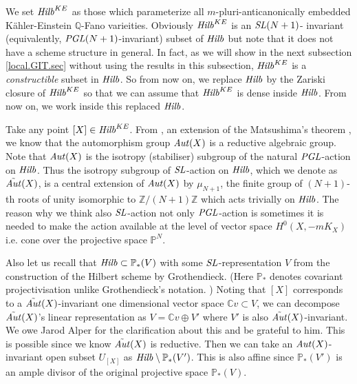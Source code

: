 \documentclass[12pt]{amsart}
\theoremstyle{remark}
\theoremstyle{definition}
\begin{document}
We set 
${\it Hilb}^{KE}$ as those which parameterize all $m$-pluri-anticanonically 
embedded K\"ahler-Einstein $\mathbb{Q}$-Fano varieities. 
Obviously ${\it Hilb}^{KE}$ is an ${\it SL}(N+1)$-
invariant (equivalently, ${\it PGL}(N+1)$-invariant) subset of ${\it Hilb}$ but note that it does not have a scheme structure in general. 
In fact, as we will show in the next subsection \ref{local.GIT.sec} 
without using the results in this subsection, 
${\it Hilb}^{KE}$ is a \textit{constructible} subset in ${\it Hilb}$. 
So from now on, we replace ${\it Hilb}$ by the Zariski closure 
of ${\it Hilb}^{KE}$ so that we can assume that ${\it Hilb}^{KE}$ 
is dense inside ${\it Hilb}$. From now on, we work inside this 
replaced ${\it Hilb}$. 

Take any point $[X]\in {\it Hilb}^{KE}$. From \cite[III Theorem 4]{CDS}, 
an extension of the Matsushima's theorem \cite{Mat}, 
we know that the automorphism group ${\it Aut}(X)$ 
is a reductive algebraic group. 
Note that ${\it Aut}(X)$ is the isotropy (stabiliser) subgroup 
of the natural ${\it PGL}$-action on ${\it Hilb}$. Thus the 
isotropy subgroup of ${\it SL}$-action on ${\it Hilb}$, which we denote 
as ${\tilde {\it Aut}}(X)$, 
is a central extension of ${\it Aut}(X)$ by $\mu_{N+1}$, the finite 
group of $(N+1)$-th roots of unity isomorphic to $\mathbb{Z}/(N+1)\mathbb{Z}$ which 
acts trivially on ${\it Hilb}$. 
The reason why we think also ${\it SL}$-action not only ${\it PGL}$-action is 
sometimes it is needed to 
make the action available at the level of vector space $H^{0}(X,-mK_{X})$ 
i.e. cone over the projective 
space $\mathbb{P}^{N}$. 

Also let us recall that 
${\it Hilb}\subset \mathbb{P}_{*}(V)$ with some ${\it SL}$-representation $V$ from 
the construction of the Hilbert scheme by Grothendieck. 
(Here $\mathbb{P}_{*}$ denotes covariant projectivisation unlike Grothendieck's 
notation. ) Noting that $[X]$ corresponds to a ${\tilde{\it Aut}}(X)$-invariant 
one dimensional vector space $\mathbb{C}v\subset V$, 
we can decompose ${\tilde{\it Aut}}(X)$'s linear 
representation as $V=\mathbb{C}v\oplus V'$ where 
$V'$ is also ${\tilde {\it Aut}}(X)$-invariant. 
We owe Jarod Alper for the clarification about this and be grateful to him. 
This is possible since 
we know ${\tilde{\it Aut}}(X)$ is 
reductive. Then we can take an ${\it Aut}(X)$-invariant open subset $U_{[X]}$ 
as ${\it Hilb}\setminus \mathbb{P}_{*}(V')$. This is also affine since 
$\mathbb{P}_{*}(V')$ is an ample divisor of the original projective space 
$\mathbb{P}_{*}(V)$. 
\end{document}
